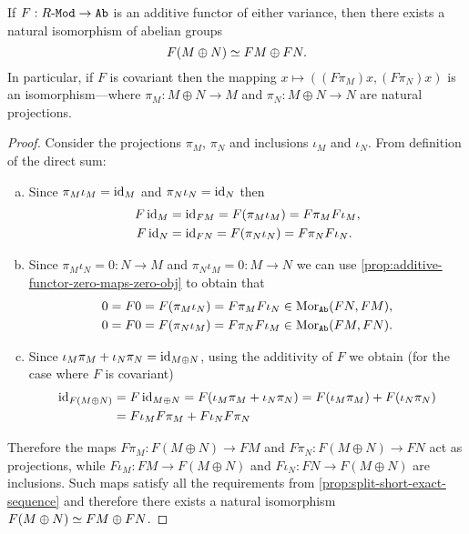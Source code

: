 \begin{proposition}
\label{prop:additive-functor-mod-to-ab-preserves-direct-sum}
If \(F: {R\text{-}\texttt{Mod}} \to {\texttt{Ab}}\) is an additive functor of either variance, then there
exists a natural isomorphism of abelian groups
\[
F(M \oplus N) \simeq F M \oplus F N.
\]
In particular, if \(F\) is covariant then the mapping
\(x \mapsto ((F \pi_M) x, (F \pi_N) x)\) is an isomorphism---where
\(\pi_M: M \oplus N \to M\) and \(\pi_N: M \oplus N \to N\) are natural projections.
\end{proposition}

\begin{proof}
Consider the projections \(\pi_M\), \(\pi_N\) and inclusions \(\iota_M\) and
\(\iota_N\). From definition of the direct sum:
\begin{enumerate}[(a)]\setlength\itemsep{0em}
\item Since \(\pi_M \iota_M = \operatorname{id}_M\) and \(\pi_N \iota_N = \operatorname{id}_N\) then
  \begin{align*}
    F \operatorname{id}_M &= \operatorname{id}_{F M} = F(\pi_M \iota_M) = F \pi_M F \iota_M, \\
    F \operatorname{id}_N &= \operatorname{id}_{F N} = F(\pi_N \iota_N) = F \pi_N F \iota_N.
  \end{align*}

\item Since \(\pi_M \iota_N = 0: N \to M\) and \(\pi_N \iota_M = 0: M \to N\) we can use
  \cref{prop:additive-functor-zero-maps-zero-obj} to obtain that
  \begin{align*}
    0 &= F 0 = F(\pi_M \iota_N) = F \pi_M F \iota_N \in \operatorname{Mor}_{{\texttt{Ab}}}(F N, F M), \\
    0 &= F 0 = F(\pi_N \iota_M) = F \pi_N F \iota_M \in \operatorname{Mor}_{{\texttt{Ab}}}(F M, F N).
  \end{align*}

\item Since \(\iota_M \pi_M + \iota_N \pi_N = \operatorname{id}_{M \oplus N}\), using the additivity of \(F\)
  we obtain (for the case where \(F\) is covariant)
  \begin{align*}
  \operatorname{id}_{F(M \oplus N)}
  &= F \operatorname{id}_{M \oplus N}
  = F(\iota_M \pi_M + \iota_N \pi_N)
  = F(\iota_M \pi_M) + F(\iota_N \pi_N) \\
  &= F \iota_M F \pi_M + F \iota_N F \pi_N
  \end{align*}
\end{enumerate}
Therefore the maps \(F \pi_M: F(M \oplus N) \to F M\) and
\(F \pi_N: F(M \oplus N) \to F N\) act as projections, while
\(F \iota_M: F M \to F(M \oplus N)\) and \(F \iota_N: F N \to F(M \oplus N)\) are inclusions. Such
maps satisfy all the requirements from \cref{prop:split-short-exact-sequence}
and therefore there exists a natural isomorphism \(F(M \oplus N) \simeq F M \oplus F N\).
\end{proof}

